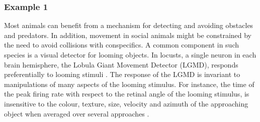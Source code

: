 \documentclass[11pt]{article}
\begin{document}
\subsubsection*{Example 1}

Most animals can benefit from a mechanism for detecting and avoiding
obstacles and predators. In addition, movement in social animals might
be constrained by the need to avoid collisions with conspecifics. A
common component in such species is a visual detector for looming
objects. In locusts, a single neuron in each brain hemisphere, the
Lobula Giant Movement Detector (LGMD), responds preferentially to
looming stimuli \cite{Rind1992}. The response of the LGMD is
invariant to manipulations of many aspects of the looming
stimulus. For instance, the time of the peak firing
rate with respect to the retinal angle of the looming stimulus, is
insensitive to the colour, texture, size, velocity and azimuth of the
approaching object when averaged over several approaches
\cite{Gabbiani2001}.
\end{document}
